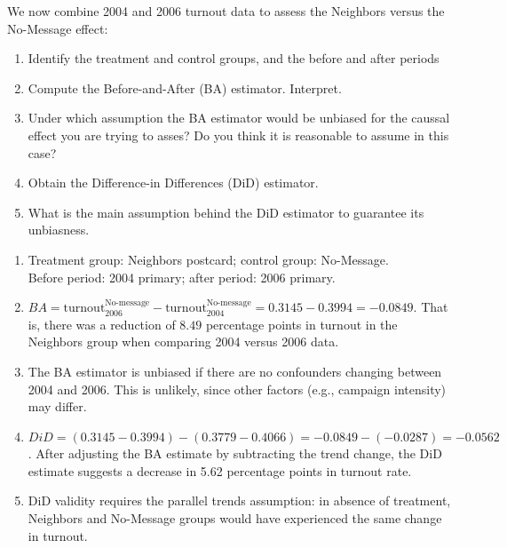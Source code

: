 \documentclass[11pt]{exam}
\begin{document}
\begin{questions}
\question[2] We now combine 2004 and 2006 turnout data to assess the Neighbors versus the No-Message effect:
\begin{enumerate}[label=(\alph*)]
  \item Identify the treatment and control groups, and the before and after periods
  \item Compute the Before-and-After (BA) estimator. Interpret.
  \item Under which assumption the BA estimator would be unbiased for the caussal effect you are trying to asses? Do you think it is reasonable to assume in this case?
  \item Obtain the Difference-in Differences (DiD) estimator.
  \item What is the main assumption behind the DiD estimator to guarantee its unbiasness.
\end{enumerate}

\begin{solution}
\begin{enumerate}[label=(\alph*)]
    \item Treatment group: Neighbors postcard; control group: No-Message. \\
          Before period: 2004 primary; after period: 2006 primary.
    
    \item $BA = \text{turnout}_{2006}^{\text{No-message}} - \text{turnout}_{2004}^{\text{No-message}} = 0.3145 - 0.3994 = -0.0849$. That is, there was a reduction of $8.49$ percentage points in turnout in the Neighbors group when comparing 2004 versus 2006 data.
    \item The BA estimator is unbiased if there are no confounders changing between 2004 and 2006. This is unlikely, since other factors (e.g., campaign intensity) may differ.
    \item $DiD = (0.3145 - 0.3994) - (0.3779 - 0.4066) = -0.0849 - (-0.0287) = -0.0562$. After adjusting the BA estimate by subtracting the trend change, the DiD estimate suggests a decrease in 5.62 percentage points in turnout rate.
    \item DiD validity requires the parallel trends assumption: in absence of treatment, Neighbors and No-Message groups would have experienced the same change in turnout.
\end{enumerate}
\end{solution}


\end{questions}
\end{document}

